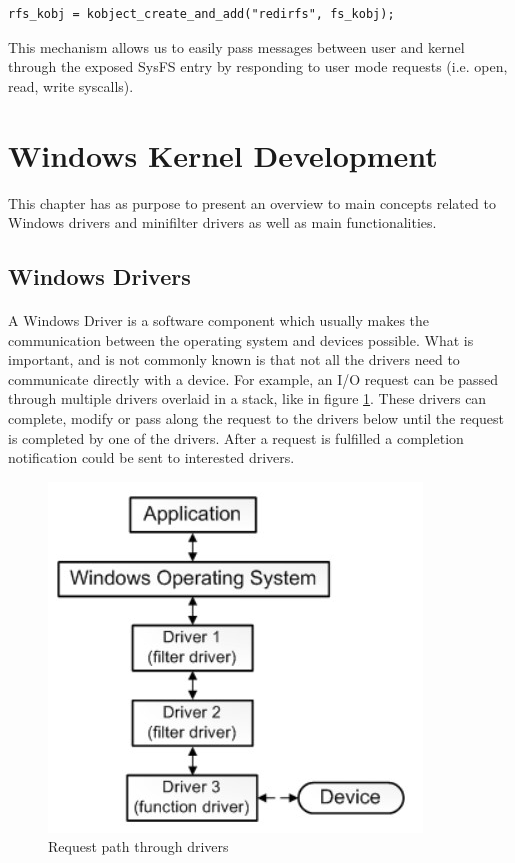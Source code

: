 	\begin{Verbatim}[fontsize=\small, commandchars=\\\{\}]
	rfs_kobj = kobject_create_and_add("redirfs", fs_kobj);
	\end{Verbatim}
	
	This mechanism allows us to easily pass messages between user and kernel through the exposed SysFS entry by responding to user mode requests (i.e. open, read, write syscalls).
	
	
	\newpage
	\section{Windows Kernel Development}
		This chapter has as purpose to present an overview to main concepts related to Windows drivers and minifilter drivers as well as main functionalities.
	
		\subsection{Windows Drivers}
		\paragraph{}
		A Windows Driver is a software component which usually makes the communication between the operating system and devices possible. What is important, and is not commonly known is that not all the drivers need to communicate directly with a device. For example, an I/O request can be passed through multiple drivers overlaid in a stack, like in figure \ref{fig:drivers}. These drivers can complete, modify or pass along the request to the drivers below until the request is completed by one of the drivers. After a request is fulfilled a completion notification could be sent to interested drivers.  \cite{MSDNWhatIsADriver}
		
		
		\begin{figure}[h!]
			\begin{center}
				\includegraphics{images/Drivers.jpg}
				\caption{Request path through drivers\cite{MSDNWhatIsADriver}}
				\label{fig:drivers}
			\end{center}
		\end{figure}
